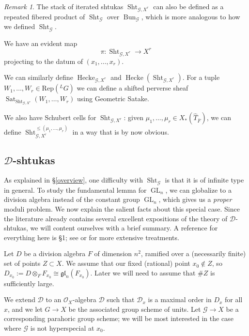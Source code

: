 \documentclass[reqno]{amsart}
\numberwithin{equation}{section}
\newcommand{\mf}[1]{\mathfrak{#1}}
\newcommand{\ol}[1]{\overline{#1}}
\newcommand{\wh}[1]{\widehat{#1}}
\newcommand{\Cal}[1]{\mathcal{#1}}
\newcommand{\co}{\colon}
\newcommand{\mrm}[1]{\mathrm{#1}}
\DeclareMathOperator{\GL}{GL}
\DeclareMathOperator{\Bun}{Bun}
\DeclareMathOperator{\Sht}{Sht}
\DeclareMathOperator{\Hecke}{Hecke}
\DeclareMathOperator{\Sat}{Sat}
\theoremstyle{remark}
\newtheorem{remark}[thm]{Remark}
\numberwithin{equation}{section}
\begin{document}
	\begin{remark}
	The stack of iterated shtukas $\Sht_{\Cal{G},X^r}$ can also be defined as a repeated fibered product of  $\Sht_{\Cal{G}}$ over $\Bun_{\Cal{G}}$, which is more analogous to how we defined $\Sht_{\Cal{G}}$.
	\end{remark}
	
	We have an evident map 
	\[
	\pi \co \Sht_{\Cal{G},X^r} \rightarrow X^r
	\]
	projecting to the datum of $(x_1, \ldots, x_r)$. 
	
	
We can similarly  define $\Hecke_{\Cal{G},X^r}$ and $\Hecke(\Sht_{\Cal{G},X^r}) $.	For a tuple $W_1, \ldots, W_r \in \mrm{Rep}({}^L G)$ we can define a shifted perverse sheaf $\Sat_{\Sht_{\Cal{G},X^r} }(W_1, \ldots, W_r)$ using Geometric Satake. 

We also have Schubert cells for $\Sht_{\Cal{G},X^r} $: given $\mu_1, \ldots, \mu_r \in X_*(\wh{T}_{\ol{F}})$, we can define $\Sht_{\Cal{G},X^r}^{\leq (\mu_1,\ldots,\mu_r)}$ in a way that is by now obvious. 



\subsection{$\Cal{D}$-shtukas}\label{subsec: D-shtukas}

As explained in \S \ref{overview}, one difficulty with $\Sht_{\Cal{G}}$ is that it is of infinite type in general. To study the fundamental lemma for $\GL_n$, we can globalize to a division algebra instead of the constant group $\GL_n$, which gives us a \emph{proper} moduli problem. We now explain the salient facts about this special case. Since the literature already contains several excellent expositions of the theory of $\Cal{D}$-shtukas, we will content ourselves with a brief summary. A reference for everything here is \cite{Ngo06} \S 1; see \cite{Laff97} or \cite{Lau04} for more extensive treatments. 



Let $D$ be a division algebra $F$ of dimension $n^2$, ramified over a (necessarily finite) set of points $Z \subset  X$. We assume that our fixed (rational) point $x_0\notin Z$, so $D_{x_0} := D \otimes_F F_{x_0} \cong \mf{gl}_n(F_{x_0})$. Later we will need to assume that $\# Z$ is sufficiently large. 

 We extend $\Cal{D}$ to an $\Cal{O}_X$-algebra $\Cal{D}$ such that  $\Cal{D}_x$ is a maximal order in $D_x$ for all $x$, and we let $G \rightarrow X$ be the associated group scheme of units. Let $\Cal{G} \rightarrow X$ be a corresponding parahoric group scheme; we will be most interested in the case where $\Cal{G}$ is not hyperspecial at $x_0$. 
 
\end{document}
